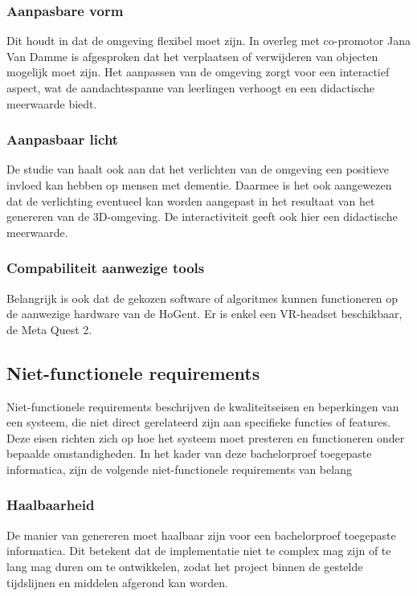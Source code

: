 \subsubsection{Aanpasbare vorm}

Dit houdt in dat de omgeving flexibel moet zijn. In overleg met co-promotor Jana Van Damme is afgesproken dat het verplaatsen of verwijderen van objecten mogelijk moet zijn. Het aanpassen van de omgeving zorgt voor een interactief aspect, wat de aandachtsspanne van leerlingen verhoogt en een didactische meerwaarde biedt.

\subsubsection{Aanpasbaar licht}

De studie van \textcite{Raes2023} haalt ook aan dat het verlichten van de omgeving een positieve invloed kan hebben op mensen met dementie. Daarmee is het ook aangewezen dat de verlichting eventueel kan worden aangepast in het resultaat van het genereren van de 3D-omgeving. De interactiviteit geeft ook hier een didactische meerwaarde.

\subsubsection{Compabiliteit aanwezige tools}

Belangrijk is ook dat de gekozen software of algoritmes kunnen functioneren op de aanwezige hardware van de HoGent. Er is enkel een VR-headset beschikbaar, de Meta Quest 2.

\subsection{Niet-functionele requirements}

Niet-functionele requirements beschrijven de kwaliteitseisen en beperkingen van een systeem, die niet direct gerelateerd zijn aan specifieke functies of features. Deze eisen richten zich op hoe het systeem moet presteren en functioneren onder bepaalde omstandigheden. In het kader van deze bachelorproef toegepaste informatica, zijn de volgende niet-functionele requirements van belang

\subsubsection{Haalbaarheid}

De manier van genereren moet haalbaar zijn voor een bachelorproef toegepaste informatica. Dit betekent dat de implementatie niet te complex mag zijn of te lang mag duren om te ontwikkelen, zodat het project binnen de gestelde tijdslijnen en middelen afgerond kan worden.


